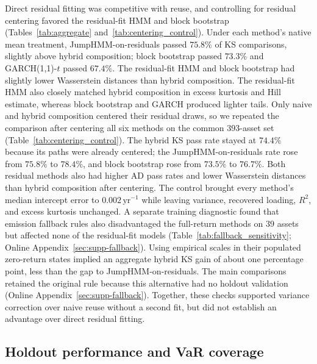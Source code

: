 Direct residual fitting was competitive with reuse, and controlling
for residual centering favored the residual-fit HMM and block
bootstrap (Tables~\ref{tab:aggregate}
and~\ref{tab:centering_control}). Under each method's native mean
treatment, JumpHMM-on-residuals passed $75.8\%$ of KS comparisons,
slightly above hybrid composition; block bootstrap passed $73.3\%$
and GARCH(1,1)-$t$ passed $67.4\%$. The residual-fit HMM and block
bootstrap had slightly lower Wasserstein distances than hybrid
composition. The residual-fit HMM also closely matched hybrid composition
in excess kurtosis and Hill estimate, whereas block bootstrap and GARCH
produced lighter tails. Only naive and hybrid composition centered
their residual draws, so we repeated the comparison after centering
all six methods on the common $393$-asset set
(Table~\ref{tab:centering_control}). The hybrid KS pass rate stayed
at $74.4\%$ because its paths were already centered; the
JumpHMM-on-residuals rate rose from $75.8\%$ to $78.4\%$, and block
bootstrap rose from $73.5\%$ to $76.7\%$. Both residual methods
also had higher AD pass rates and lower Wasserstein distances than
hybrid composition after centering. The control brought every
method's median intercept error to $0.002\,\mathrm{yr}^{-1}$ while
leaving variance, recovered loading, $R^2$, and excess kurtosis
unchanged. A separate training diagnostic found that emission fallback rules
also disadvantaged the full-return methods on $39$ assets but affected
none of the residual-fit models (Table~\ref{tab:fallback_sensitivity}; Online Appendix~\ref{sec:supp-fallback}). Using empirical scales in their
populated zero-return states implied an aggregate hybrid KS gain of
about one percentage point, less than the gap to JumpHMM-on-residuals.
The main comparisons retained the original rule because this
alternative had no holdout validation (Online
Appendix~\ref{sec:supp-fallback}). Together, these
checks supported variance correction over naive reuse without a
second fit, but did not establish an advantage over direct residual
fitting.

\subsection{Holdout performance and VaR coverage}

